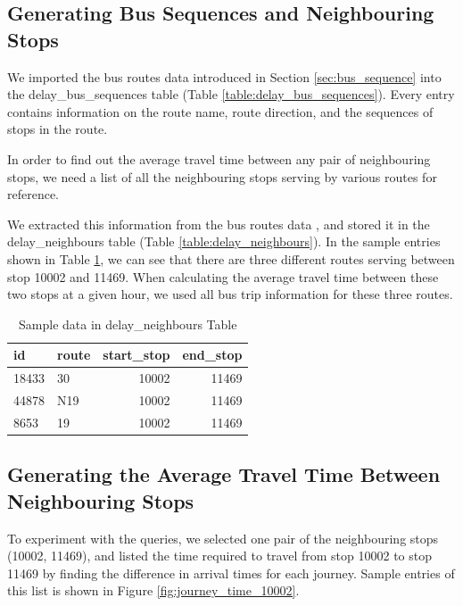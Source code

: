 \subsection{Generating Bus Sequences and Neighbouring Stops}
\label{sec:bus_stop_locations_routes}
\par We imported the bus routes data introduced in Section \ref{sec:bus_sequence} into the delay\_bus\_sequences table (Table \ref{table:delay_bus_sequences}). Every entry contains information on the route name, route direction, and the sequences of stops in the route.

\par In order to find out the average travel time between any pair of neighbouring stops, we need a list of all the neighbouring stops serving by various routes for reference.

\par We extracted this information from the bus routes data , and stored it in the delay\_neighbours table (Table \ref{table:delay_neighbours}). In the sample entries shown in Table \ref{table:sample_neighbours_view}, we can see that there are three different routes serving between stop 10002 and 11469. When calculating the average travel time between these two stops at a given hour, we used all bus trip information for these three routes.

\begin{table}
\centering
\begin{tabular}{@{}llrr@{}} \toprule
id & route & start\_stop & end\_stop \\ \midrule
18433 & 30 & 10002 & 11469 \\
44878 & N19 & 10002 & 11469 \\
8653 & 19 & 10002 & 11469 \\ \bottomrule
\end{tabular}
\caption{Sample data in delay\_neighbours Table}
\label{table:sample_neighbours_view}
\end{table}

\subsection{Generating the Average Travel Time Between Neighbouring Stops}
\par To experiment with the queries, we selected one pair of the neighbouring stops (10002, 11469), and listed the time required to travel from stop 10002 to stop 11469 by finding the difference in arrival times for each journey. Sample entries of this list is shown in Figure \ref{fig:journey_time_10002}.

